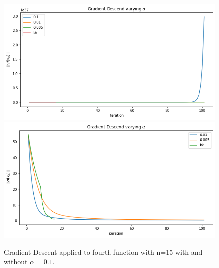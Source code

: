 \documentclass[a4paper,10pt]{report}
\begin{document}
\begin{figure}[!htb]
    \includegraphics[width=\linewidth]{4_a_n15_1.png}
  \endminipage\hfill
    \includegraphics[width=\linewidth]{4_a_n15_2.png}
  \endminipage\hfill
  \caption{Gradient Descent applied to fourth function with n=15 with and without $\alpha=0.1$.}
  \label{fig:4_n15}
\end{figure}
\end{document}
